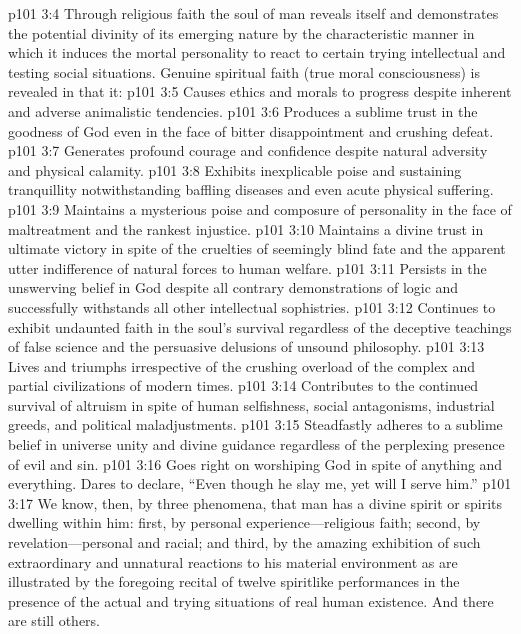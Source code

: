 \vs p101 3:4 Through religious faith the soul of man reveals itself and demonstrates the potential divinity of its emerging nature by the characteristic manner in which it induces the mortal personality to react to certain trying intellectual and testing social situations. Genuine spiritual faith (true moral consciousness) is revealed in that it:
\pc \vs p101 3:5 \bibnobreakspace Causes ethics and morals to progress despite inherent and adverse animalistic tendencies.
\vs p101 3:6 \bibnobreakspace Produces a sublime trust in the goodness of God even in the face of bitter disappointment and crushing defeat.
\vs p101 3:7 \bibnobreakspace Generates profound courage and confidence despite natural adversity and physical calamity.
\vs p101 3:8 \bibnobreakspace Exhibits inexplicable poise and sustaining tranquillity notwithstanding baffling diseases and even acute physical suffering.
\vs p101 3:9 \bibnobreakspace Maintains a mysterious poise and composure of personality in the face of maltreatment and the rankest injustice.
\vs p101 3:10 \bibnobreakspace Maintains a divine trust in ultimate victory in spite of the cruelties of seemingly blind fate and the apparent utter indifference of natural forces to human welfare.
\vs p101 3:11 \bibnobreakspace Persists in the unswerving belief in God despite all contrary demonstrations of logic and successfully withstands all other intellectual sophistries.
\vs p101 3:12 \bibnobreakspace Continues to exhibit undaunted faith in the soul’s survival regardless of the deceptive teachings of false science and the persuasive delusions of unsound philosophy.
\vs p101 3:13 \bibnobreakspace Lives and triumphs irrespective of the crushing overload of the complex and partial civilizations of modern times.
\vs p101 3:14 \bibnobreakspace Contributes to the continued survival of altruism in spite of human selfishness, social antagonisms, industrial greeds, and political maladjustments.
\vs p101 3:15 \bibnobreakspace Steadfastly adheres to a sublime belief in universe unity and divine guidance regardless of the perplexing presence of evil and sin.
\vs p101 3:16 \bibnobreakspace Goes right on worshiping God in spite of anything and everything. Dares to declare, “Even though he slay me, yet will I serve him.”
\pc \vs p101 3:17 We know, then, by three phenomena, that man has a divine spirit or spirits dwelling within him: first, by personal experience---religious faith; second, by revelation---personal and racial; and third, by the amazing exhibition of such extraordinary and unnatural reactions to his material environment as are illustrated by the foregoing recital of twelve spiritlike performances in the presence of the actual and trying situations of real human existence. And there are still others.\minusone
